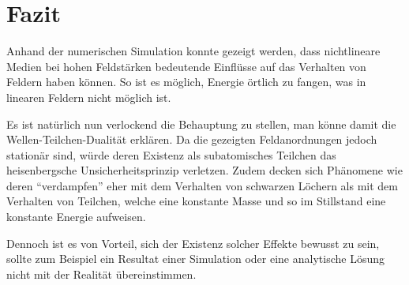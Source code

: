 %
%
%
%
\section{Fazit\label{particles:section:fazit}}

Anhand der numerischen Simulation konnte gezeigt werden, dass nichtlineare Medien bei hohen Feldstärken bedeutende Einflüsse auf das Verhalten von Feldern haben können.
So ist es möglich, Energie örtlich zu fangen, was in linearen Feldern nicht möglich ist.

Es ist natürlich nun verlockend die Behauptung zu stellen, man könne damit die Wellen-Teilchen-Dualität erklären.
Da die gezeigten Feldanordnungen jedoch stationär sind, würde deren Existenz als subatomisches Teilchen das heisenbergsche Unsicherheitsprinzip verletzen.
Zudem decken sich Phänomene wie deren ``verdampfen'' eher mit dem Verhalten von schwarzen Löchern als mit dem Verhalten von Teilchen, welche eine konstante Masse und so im Stillstand eine konstante Energie aufweisen.

Dennoch ist es von Vorteil, sich der Existenz solcher Effekte bewusst zu sein, sollte zum Beispiel ein Resultat einer Simulation oder eine analytische Lösung nicht mit der Realität übereinstimmen.


